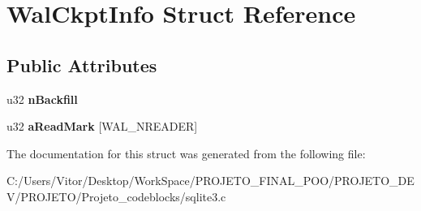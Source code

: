 \hypertarget{struct_wal_ckpt_info}{\section{Wal\-Ckpt\-Info Struct Reference}
\label{struct_wal_ckpt_info}
}
\subsection*{Public Attributes}
\begin{DoxyCompactItemize}
\item 
\hypertarget{struct_wal_ckpt_info_a5185e508f7da44c391b692e957a84ff6}{u32 {\bfseries n\-Backfill}}\label{struct_wal_ckpt_info_a5185e508f7da44c391b692e957a84ff6}

\item 
\hypertarget{struct_wal_ckpt_info_a3bc01a8244045941d5f59f01123a7735}{u32 {\bfseries a\-Read\-Mark} \mbox{[}W\-A\-L\-\_\-\-N\-R\-E\-A\-D\-E\-R\mbox{]}}\label{struct_wal_ckpt_info_a3bc01a8244045941d5f59f01123a7735}

\end{DoxyCompactItemize}


The documentation for this struct was generated from the following file\-:\begin{DoxyCompactItemize}
\item 
C\-:/\-Users/\-Vitor/\-Desktop/\-Work\-Space/\-P\-R\-O\-J\-E\-T\-O\-\_\-\-F\-I\-N\-A\-L\-\_\-\-P\-O\-O/\-P\-R\-O\-J\-E\-T\-O\-\_\-\-D\-E\-V/\-P\-R\-O\-J\-E\-T\-O/\-Projeto\-\_\-codeblocks/sqlite3.\-c\end{DoxyCompactItemize}
